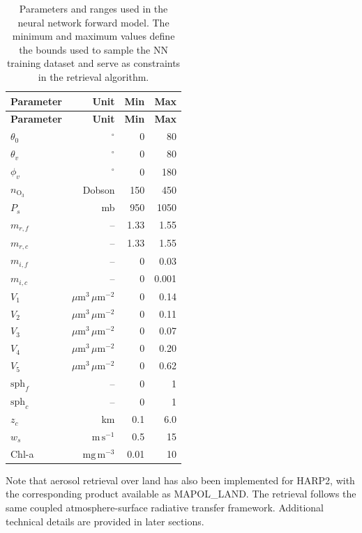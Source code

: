 \documentclass[
  11pt,
  letterpaper,
  DIV=11,
  numbers=noendperiod]{scrreprt}
\begin{document}
\begin{longtable}[]{@{}lrrr@{}}
\caption{Parameters and ranges used in the neural network forward model.
The minimum and maximum values define the bounds used to sample the NN
training dataset and serve as constraints in the retrieval
algorithm.}\label{tbl-param-ranges}\tabularnewline
\toprule\noalign{}
\textbf{Parameter} & \textbf{Unit} & \textbf{Min} & \textbf{Max} \\
\midrule\noalign{}
\endfirsthead
\toprule\noalign{}
\textbf{Parameter} & \textbf{Unit} & \textbf{Min} & \textbf{Max} \\
\midrule\noalign{}
\endhead
\bottomrule\noalign{}
\endlastfoot
\(\theta_0\) & \(^\circ\) & 0 & 80 \\
\(\theta_v\) & \(^\circ\) & 0 & 80 \\
\(\phi_v\) & \(^\circ\) & 0 & 180 \\
\(n_{\mathrm{O}_3}\) & Dobson & 150 & 450 \\
\(P_s\) & mb & 950 & 1050 \\
\(m_{r,f}\) & -- & 1.33 & 1.55 \\
\(m_{r,c}\) & -- & 1.33 & 1.55 \\
\(m_{i,f}\) & -- & 0 & 0.03 \\
\(m_{i,c}\) & -- & 0 & 0.001 \\
\(V_1\) & \(\mu\mathrm{m}^3\,\mu\mathrm{m}^{-2}\) & 0 & 0.14 \\
\(V_2\) & \(\mu\mathrm{m}^3\,\mu\mathrm{m}^{-2}\) & 0 & 0.11 \\
\(V_3\) & \(\mu\mathrm{m}^3\,\mu\mathrm{m}^{-2}\) & 0 & 0.07 \\
\(V_4\) & \(\mu\mathrm{m}^3\,\mu\mathrm{m}^{-2}\) & 0 & 0.20 \\
\(V_5\) & \(\mu\mathrm{m}^3\,\mu\mathrm{m}^{-2}\) & 0 & 0.62 \\
\(\mathrm{sph}_f\) & -- & 0 & 1 \\
\(\mathrm{sph}_c\) & -- & 0 & 1 \\
\(z_c\) & km & 0.1 & 6.0 \\
\(w_s\) & \(\mathrm{m}\,\mathrm{s}^{-1}\) & 0.5 & 15 \\
Chl-a & \(\mathrm{mg}\,\mathrm{m}^{-3}\) & 0.01 & 10 \\
\end{longtable}

Note that aerosol retrieval over land has also been implemented for
HARP2, with the corresponding product available as MAPOL\_LAND. The
retrieval follows the same coupled atmosphere-surface radiative transfer
framework. Additional technical details are provided in later sections.
\end{document}
